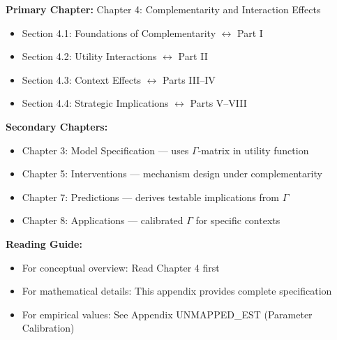 \begin{tcolorbox}[colback=purple!5!white, colframe=purple!75!black, 
    title=\textbf{Chapter Linkages}]

\textbf{Primary Chapter:} Chapter 4: Complementarity and Interaction Effects
\begin{itemize}[nosep]
    \item Section 4.1: Foundations of Complementarity $\leftrightarrow$ Part I
    \item Section 4.2: Utility Interactions $\leftrightarrow$ Part II
    \item Section 4.3: Context Effects $\leftrightarrow$ Parts III--IV
    \item Section 4.4: Strategic Implications $\leftrightarrow$ Parts V--VIII
\end{itemize}

\textbf{Secondary Chapters:}
\begin{itemize}[nosep]
    \item Chapter 3: Model Specification --- uses $\Gamma$-matrix in utility function
    \item Chapter 5: Interventions --- mechanism design under complementarity
    \item Chapter 7: Predictions --- derives testable implications from $\Gamma$
    \item Chapter 8: Applications --- calibrated $\Gamma$ for specific contexts
\end{itemize}

\textbf{Reading Guide:}
\begin{itemize}[nosep]
    \item For conceptual overview: Read Chapter 4 first
    \item For mathematical details: This appendix provides complete specification
    \item For empirical values: See Appendix UNMAPPED_EST (Parameter Calibration)
\end{itemize}

\end{tcolorbox}


